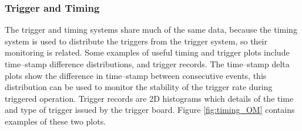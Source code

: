\subsubsection*{Trigger and Timing}
The trigger and timing systems share much of the same data, because the timing
system is used to distribute the triggers from the trigger system, so their
monitoring is related. Some examples of useful timing and trigger plots include
time--stamp difference distributions, and trigger records. The time--stamp delta
plots show the difference in time--stamp between consecutive events, this
distribution can be used to monitor the stability of the trigger rate during
triggered operation. Trigger records are 2D histograms which details of
the time and type of trigger issued by the trigger board. Figure
\ref{fig:timing_OM} contains examples of these two plots.

